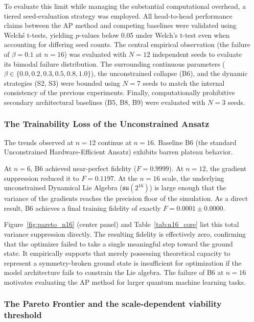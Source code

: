 \documentclass[pdflatex,sn-mathphys-num]{sn-jnl}
\theoremstyle{thmstyleone}
\theoremstyle{thmstyletwo}
\theoremstyle{thmstylethree}
\begin{document}
To evaluate this limit while managing the substantial computational overhead, a tiered seed-evaluation strategy was employed. All head-to-head performance claims between the AP method and competing baselines were validated using Welch\'s t-tests, yielding $p$-values below 0.05 under Welch's t-test even when accounting for differing seed counts. The central empirical observation (the failure of $\beta=0.1$ at $n=16$) was evaluated with $N=12$ independent seeds to evaluate its bimodal failure distribution. The surrounding continuous parameters ($\beta \in \{0.0, 0.2, 0.3, 0.5, 0.8, 1.0\}$), the unconstrained collapse (B6), and the dynamic strategies (S2, S3) were bounded using $N=7$ seeds to match the internal consistency of the previous experiments. Finally, computationally prohibitive secondary architectural baselines (B5, B8, B9) were evaluated with $N=3$ seeds.

\subsubsection{The Trainability Loss of the Unconstrained Ansatz}

The trends observed at $n=12$ continue at $n=16$. Baseline B6 (the standard Unconstrained Hardware-Efficient Ansatz) exhibits barren plateau behavior.

At $n=6$, B6 achieved near-perfect fidelity ($F=0.9999$). At $n=12$, the gradient suppression reduced it to $F=0.1197$. At the $n=16$ scale, the underlying unconstrained Dynamical Lie Algebra ($\mathfrak{su}(2^{16})$) is large enough that the variance of the gradients reaches the precision floor of the simulation. As a direct result, B6 achieves a final training fidelity of exactly $F=0.0001 \pm 0.0000$.

Figure~\ref{fig:pareto_n16} (center panel) and Table~\ref{tab:n16_core} list this total variance suppression directly. The resulting fidelity is effectively zero, confirming that the optimizer failed to take a single meaningful step toward the ground state. It empirically supports that merely possessing theoretical capacity to represent a symmetry-broken ground state is insufficient for optimization if the model architecture fails to constrain the Lie algebra. The failure of B6 at $n=16$ motivates evaluating the AP method for larger quantum machine learning tasks.

\subsubsection{The Pareto Frontier and the scale-dependent viability threshold}
\end{document}
